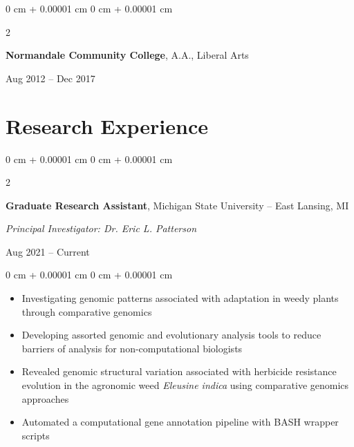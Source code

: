 \documentclass[10pt, letterpaper]{article}
\newenvironment{highlights}{
    \begin{itemize}[
        topsep=0.10 cm,
        parsep=0.10 cm,
        partopsep=0pt,
        itemsep=0pt,
        leftmargin=0 cm + 10pt
    ]
}{
    \end{itemize}
} %
\newenvironment{onecolentry}{
    \begin{adjustwidth}{
        0 cm + 0.00001 cm
    }{
        0 cm + 0.00001 cm
    }
}{
    \end{adjustwidth}
} %
\newenvironment{twocolentry}[2][]{
    \onecolentry
    \def\secondColumn{#2}
    \setcolumnwidth{\fill, 4.5 cm}
    \begin{paracol}{2}
}{
    \switchcolumn \raggedleft \secondColumn
    \end{paracol}
    \endonecolentry
} %
\begin{document}
        \vspace{0.2 cm}
        

        \begin{twocolentry}{
            Aug 2012 – Dec 2017
            }
            \textbf{Normandale Community College}, A.A., Liberal Arts
        \end{twocolentry}



    
    \section{Research Experience}




        \begin{samepage}        
            \begin{twocolentry}{
                Aug 2021 – Current
                }
                \textbf{Graduate Research Assistant}, Michigan State University -- East Lansing, MI
                
                \vspace{0.05 cm}

                \textit{Principal Investigator: Dr. Eric L. Patterson}
            \end{twocolentry}
        \end{samepage}
        
        \vspace{0.10 cm}
        
        \begin{onecolentry}
            \begin{highlights}
                \item Investigating genomic patterns associated with adaptation in weedy plants through comparative genomics
                \item Developing assorted genomic and evolutionary analysis tools to reduce barriers of analysis for non-computational biologists
                \item Revealed genomic structural variation associated with herbicide resistance evolution in the agronomic weed \textit{Eleusine indica} using comparative genomics approaches
                \item Automated a computational gene annotation pipeline with BASH wrapper scripts
            \end{highlights}
        \end{onecolentry}
\end{document}
